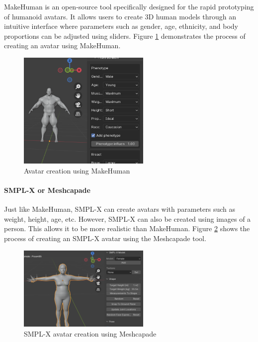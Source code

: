\documentclass[../../main.tex]{subfiles}
\begin{document}
MakeHuman is an open-source tool specifically designed for the rapid prototyping of humanoid avatars. It allows users to create 3D human models through an intuitive interface where parameters such as gender, age, ethnicity, and body proportions can be adjusted using sliders. Figure \ref{fig:makehuman_example} demonstrates the process of creating an avatar using MakeHuman.

\begin{figure} 
  \centering \includegraphics[width = 2.5in]{chapters/background_work/images/makehuman_example.png} 
  \caption{Avatar creation using MakeHuman} 
  \label{fig:makehuman_example} 
\end{figure}

\paragraph{SMPL-X or Meshcapade}
\label{par:smpl_x_meshcapade}

Just like MakeHuman, SMPL-X can create avatars with parameters such as weight, height, age, etc. However, SMPL-X can also be created using images of a person. This allows it to be more realistic than MakeHuman. Figure \ref{fig:smpl_creation_example} shows the process of creating an SMPL-X avatar using the Meshcapade tool.

\begin{figure} 
  \centering \includegraphics[width = 2.5in]{chapters/background_work/images/smpl_creation_example.png} 
  \caption{SMPL-X avatar creation using Meshcapade} 
  \label{fig:smpl_creation_example} 
\end{figure}
\end{document}
